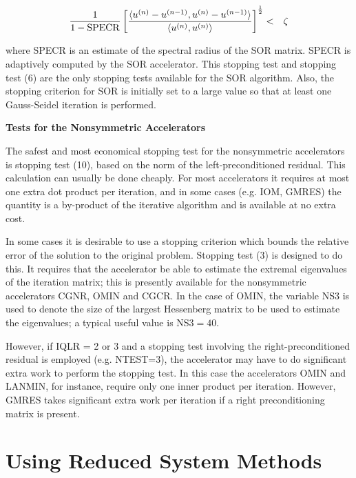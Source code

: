 \begin{eqnarray*}
      \frac{1}{1-{\rm SPECR}} \left[ \frac
            {\langle u^{(n)}-u^{(n-1)},u^{(n)}-u^{(n-1)}\rangle }
              {\langle u^{(n)},u^{(n)}\rangle } \right]
                          ^{\frac{1}{2}} & < & \zeta
\end{eqnarray*}
 
\noindent
where SPECR is an estimate of the spectral radius of the SOR matrix.
SPECR is adaptively computed by the SOR accelerator.
This stopping test and stopping test (6) are the only stopping tests
available for the SOR algorithm.  Also, the stopping criterion for 
SOR is initially set to a large value so that at least one Gauss-Seidel 
iteration is performed.

\bigskip
\noindent
{\bf Tests for the Nonsymmetric Accelerators}
\bigskip
\indent
 
    The safest and most economical stopping test for the nonsymmetric
accelerators
is stopping test (10), based on the norm of the left-preconditioned residual.
This calculation can usually be done cheaply.  For most accelerators it
requires at most one extra dot product per iteration, and in some cases
(e.g. IOM, GMRES) the quantity is a by-product of the iterative algorithm and
is available at no extra cost.

    In some cases it is desirable to use a stopping criterion
which bounds the relative error of the solution to the original problem.
Stopping test (3) is designed to do this.  It requires that the
accelerator be able to estimate the extremal eigenvalues of the iteration
matrix; this is presently available for the nonsymmetric accelerators CGNR,
OMIN and CGCR.  In the case of OMIN, the variable NS3 is used to denote
the size of the largest Hessenberg matrix to be used to estimate
the eigenvalues; a typical useful value is NS3$=40$.

    However, if IQLR = 2 or 3 and a stopping test involving the
right-preconditioned residual is employed (e.g. NTEST=3), the accelerator may
have to do significant extra work to perform the stopping test.  In this
case the accelerators OMIN and LANMIN, for instance, require only one inner
product per iteration.  However, GMRES takes significant extra work per
iteration if a right preconditioning matrix is present.
 
\newpage
\section{Using Reduced System Methods}
\label{rb}
\indent
 
